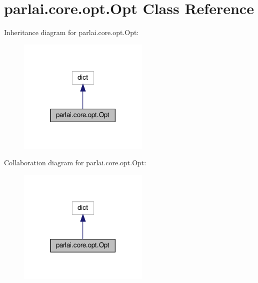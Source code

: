 \hypertarget{classparlai_1_1core_1_1opt_1_1Opt}{}\section{parlai.\+core.\+opt.\+Opt Class Reference}
\label{classparlai_1_1core_1_1opt_1_1Opt}


Inheritance diagram for parlai.\+core.\+opt.\+Opt\+:
\nopagebreak
\begin{figure}[H]
\begin{center}
\leavevmode
\includegraphics[width=177pt]{d7/d3b/classparlai_1_1core_1_1opt_1_1Opt__inherit__graph}
\end{center}
\end{figure}


Collaboration diagram for parlai.\+core.\+opt.\+Opt\+:
\nopagebreak
\begin{figure}[H]
\begin{center}
\leavevmode
\includegraphics[width=177pt]{d5/ddd/classparlai_1_1core_1_1opt_1_1Opt__coll__graph}
\end{center}
\end{figure}
